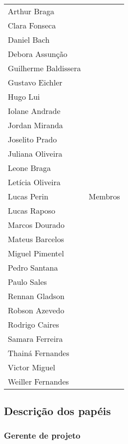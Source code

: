   \begin{table}[ht]
    \centering
    \begin{tabular}{| p{4cm} | p{4cm} |}
      Arthur Braga & \multirow{27}{*}{Membros}  \\
      Clara Fonseca & \\
      Daniel Bach & \\
      Debora Assunção & \\
      Guilherme Baldissera & \\
      Gustavo Eichler & \\
      Hugo Lui & \\
      Iolane Andrade & \\
      Jordan Miranda & \\
      Joselito Prado & \\
      Juliana Oliveira & \\
      Leone Braga & \\
      Letícia Oliveira & \\
      Lucas Perin & \\
      Lucas Raposo & \\
      Marcos Dourado & \\
      Mateus Barcelos & \\
      Miguel Pimentel & \\
      Pedro Santana & \\
      Paulo Sales & \\
      Rennan Gladson & \\
      Robson Azevedo & \\
      Rodrigo Caires & \\
      Samara Ferreira & \\
      Thainá Fernandes & \\
      Victor Miguel & \\
      Weiller Fernandes & \\
      \hline

    \end{tabular}
  \end{table}


  \subsection{Descrição dos papéis}

    \subsubsection{Gerente de projeto}

